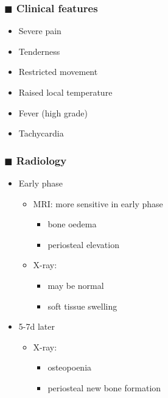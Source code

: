 \documentclass[
  14pt,
]{memoir}
\providecommand{\tightlist}{%
  \setlength{\itemsep}{0pt}\setlength{\parskip}{0pt}}
\begin{document}
\hypertarget{blacksquare-clinical-features}{%
\subsubsection{\texorpdfstring{\(\blacksquare\) Clinical
features}{\textbackslash blacksquare Clinical features}}\label{blacksquare-clinical-features}}

\begin{itemize}
\tightlist
\item
  Severe pain
\item
  Tenderness
\item
  Restricted movement
\item
  Raised local temperature
\item
  Fever (high grade)
\item
  Tachycardia
\end{itemize}

\hypertarget{blacksquare-radiology}{%
\subsubsection{\texorpdfstring{\(\blacksquare\)
Radiology}{\textbackslash blacksquare Radiology}}\label{blacksquare-radiology}}

\begin{itemize}
\tightlist
\item
  Early phase

  \begin{itemize}
  \tightlist
  \item
    MRI: more sensitive in early phase

    \begin{itemize}
    \tightlist
    \item
      bone oedema
    \item
      periosteal elevation
    \end{itemize}
  \item
    X-ray:

    \begin{itemize}
    \tightlist
    \item
      may be normal
    \item
      soft tissue swelling
    \end{itemize}
  \end{itemize}
\item
  5-7d later

  \begin{itemize}
  \tightlist
  \item
    X-ray:

    \begin{itemize}
    \tightlist
    \item
      osteopoenia
    \item
      periosteal new bone formation
    \end{itemize}
  \end{itemize}
\end{itemize}
\end{document}
